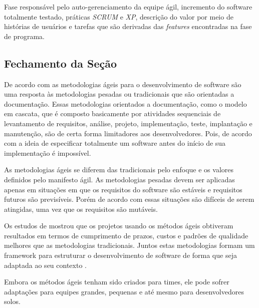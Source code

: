 Fase responsável pelo auto-gerenciamento da equipe ágil, incremento do software totalmente testado, práticas \textit{SCRUM} e \textit{XP}, descrição do valor por meio de histórias de usuários e tarefas que são derivadas das \textit{features} encontradas na fase de programa.


\subsection{Fechamento da Seção}

De acordo com \cite{soares} as metodologias ágeis para o desenvolvimento de software são uma resposta às metodologias pesadas ou tradicionais que são orientadas a documentação. Essas metodologias orientados a documentação, como o modelo em cascata, que é composto basicamente por atividades sequenciais de levantamento de requisitos, análise, projeto, implementação, teste, implantação e manutenção, são de certa forma limitadores aos desenvolvedores. Pois, de acordo com \cite{brooks} a ideia de especificar totalmente um software antes do início de sua implementação é impossível.

As metodologias ágeis se diferem das tradicionais pelo enfoque e os valores definidos pelo manifesto ágil. As metodologias pesadas devem ser aplicadas apenas em situações em que os requisitos do software são estáveis e requisitos futuros são previsíveis. Porém de acordo com \cite{soares} essas situações são difíceis de serem atingidas, uma vez que os requisitos são mutáveis.

Os estudos de \cite{charette} mostrou que os projetos usando os métodos ágeis obtiveram resultados em termos de cumprimento de prazos, custos e padrões de qualidade melhores que as metodologias tradicionais. Juntos estas metodologias formam um framework para estruturar o desenvolvimento de software de forma que seja adaptada ao seu contexto \cite{soares}.

Embora os métodos ágeis tenham sido criados para times, ele pode sofrer adaptações para equipes grandes, pequenas e até mesmo para desenvolvedores solos. \cite{soares}
